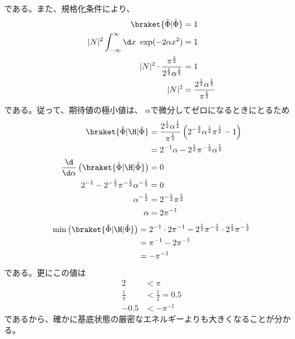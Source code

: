である。また、規格化条件により、
\begin{align}
	\braket{\tilde{\Phi}|\tilde{\Phi}}
&=
	1 \\
%
%
	|N|^2
		\int_{-\infty}^{\infty} \d x\
			\exp(-2\alpha x^2)
&=
	1 \\
%
%
	|N|^2 \cdot
		\frac{
			\pi^{\frac{1}{2}}
		}{
			2^{\frac{1}{2}} \alpha^{\frac{1}{2}}
		}
&=
	1 \\
%
%
	|N|^2
&=
	\frac{
		2^{\frac{1}{2}} \alpha^{\frac{1}{2}}
	}{
		\pi^{\frac{1}{2}}
	}
\end{align}
である。従って、期待値の極小値は、
$\alpha$で微分してゼロになるときにとるため
\begin{align}
	\braket{\tilde{\Phi}|\H|\tilde{\Phi}}
&=
	\frac{
		2^{\frac{1}{2}} \alpha^{\frac{1}{2}}
	}{
		\pi^{\frac{1}{2}}
	}
		\left(
			2^{-\frac{3}{2}} \alpha^{\frac{1}{2}} \pi^{\frac{1}{2}}
			-
			1
		\right) \\
%
%
&=
	2^{-1} \alpha
	-
	2^{\frac{1}{2}} \pi^{-\frac{1}{2}} \alpha^{\frac{1}{2}} \\
%
%
	\frac{\d}{\d \alpha}\left(
		\braket{\tilde{\Phi}|\H|\tilde{\Phi}}
	\right)
&=
	0 \\
%
%
	2^{-1}
	-
	2^{-\frac{1}{2}} \pi^{-\frac{1}{2}} \alpha^{-\frac{1}{2}}
&=
	0 \\
%
%
	\alpha^{-\frac{1}{2}}
&=
	2^{-\frac{1}{2}} \pi^{\frac{1}{2}} \\
%
%
	\alpha
&=
	2 \pi^{-1}
\end{align}
\begin{align}
	\min\left(
		\braket{\tilde{\Phi}|\H|\tilde{\Phi}}
	\right)
&=
	2^{-1} \cdot 2\pi^{-1}
	-
	2^{\frac{1}{2}} \pi^{-\frac{1}{2}} \cdot 2^{\frac{1}{2}} \pi^{-\frac{1}{2}} \\
%
%
&=
	\pi^{-1}
	-
	2 \pi^{-1} \\
%
%
&=
	-\pi^{-1}
\end{align}
である。更にこの値は
\begin{align}
	2
&<
	\pi \\
%
%
	\frac{1}{\pi}
&<
	\frac{1}{2}
=
	0.5 \\
%
%
	-0.5
&<
	-\pi^{-1}
\end{align}
であるから、確かに基底状態の厳密なエネルギーよりも大きくなることが分かる。


